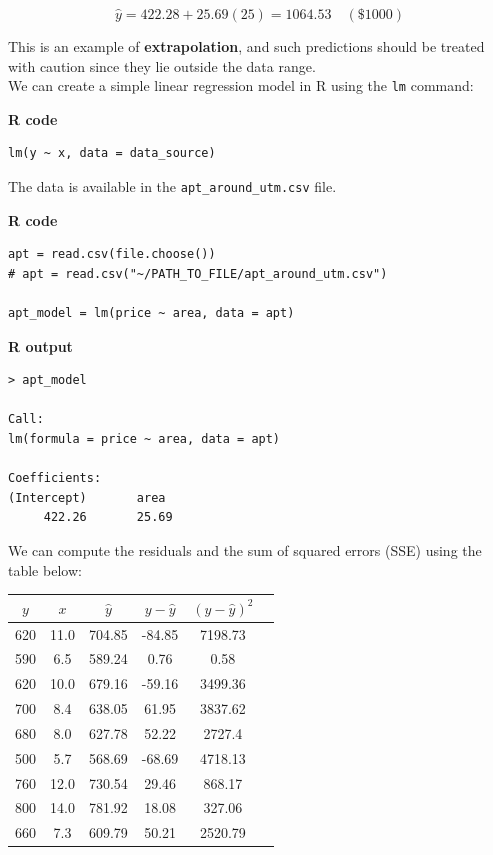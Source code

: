 \begin{example}
\[
\hat{y} = 422.28 + 25.69(25) = 1064.53 \quad (\$1000)
\]

This is an example of \textbf{extrapolation}, and such predictions should be treated with caution since they lie outside the data range.\\
We can create a simple linear regression model in R using the \texttt{lm} command:

\noindent\textbf{R code}
\begin{tcolorbox}[colback=gray!10, colframe=black!45, arc=2mm,
  before skip=4pt, after skip=4pt]
\begin{verbatim}
lm(y ~ x, data = data_source)
\end{verbatim}
\end{tcolorbox}

\noindent The data is available in the \texttt{apt\_around\_utm.csv} file.

\noindent\textbf{R code}
\begin{tcolorbox}[colback=gray!10, colframe=black!45, arc=2mm,
  before skip=4pt, after skip=4pt]
\begin{verbatim}
apt = read.csv(file.choose())
# apt = read.csv("~/PATH_TO_FILE/apt_around_utm.csv")

apt_model = lm(price ~ area, data = apt)
\end{verbatim}
\end{tcolorbox}

\noindent\textbf{R output}
\begin{tcolorbox}[colback=gray!10, colframe=black!45, arc=2mm,
  before skip=4pt, after skip=4pt]
\begin{verbatim}
> apt_model

Call:
lm(formula = price ~ area, data = apt)

Coefficients:
(Intercept)       area  
     422.26       25.69  
\end{verbatim}
\end{tcolorbox}

We can compute the residuals and the sum of squared errors (SSE) using the table below:

\begin{center}
\renewcommand{\arraystretch}{1.0}
\begin{tabular}{cccccc}
\toprule
$y$ & $x$ & $\hat{y}$ & $y - \hat{y}$ & $(y - \hat{y})^2$ \\
\midrule
620 & 11.0 & 704.85 & -84.85 & 7198.73 \\
590 & 6.5 & 589.24 & 0.76 & 0.58 \\
620 & 10.0 & 679.16 & -59.16 & 3499.36 \\
700 & 8.4 & 638.05 & 61.95 & 3837.62 \\
680 & 8.0 & 627.78 & 52.22 & 2727.4 \\
500 & 5.7 & 568.69 & -68.69 & 4718.13 \\
760 & 12.0 & 730.54 & 29.46 & 868.17 \\
800 & 14.0 & 781.92 & 18.08 & 327.06 \\
660 & 7.3 & 609.79 & 50.21 & 2520.79 \\
\bottomrule
\end{tabular}
\end{center}


\end{example}
